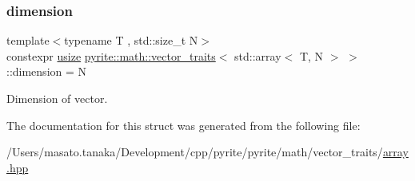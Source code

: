 \subsubsection{\texorpdfstring{dimension}{dimension}}
{\footnotesize\ttfamily template$<$typename T , std\+::size\+\_\+t N$>$ \\
constexpr \mbox{\hyperlink{type_8hpp_a3984e6dc0a53b867e054e8447f2f2be1}{usize}} \mbox{\hyperlink{structpyrite_1_1math_1_1vector__traits}{pyrite\+::math\+::vector\+\_\+traits}}$<$ std\+::array$<$ T, N $>$ $>$\+::dimension = N\hspace{0.3cm}{\ttfamily [static]}}

Dimension of vector. 

The documentation for this struct was generated from the following file\+:\begin{DoxyCompactItemize}
\item 
/\+Users/masato.\+tanaka/\+Development/cpp/pyrite/pyrite/math/vector\+\_\+traits/\mbox{\hyperlink{array_8hpp}{array.\+hpp}}\end{DoxyCompactItemize}
